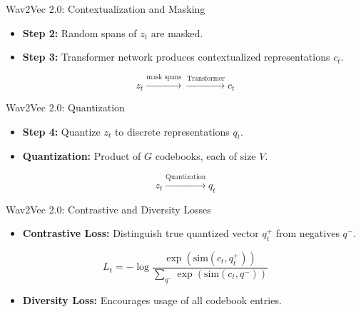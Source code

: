 \begin{frame}{Wav2Vec 2.0: Contextualization and Masking}
    \begin{itemize}
        \item \textbf{Step 2:} Random spans of $z_t$ are masked.
        \item \textbf{Step 3:} Transformer network produces contextualized representations $c_t$.
    \end{itemize}
    \[
        z_t \xrightarrow{\text{mask spans}} \xrightarrow{\text{Transformer}} c_t
    \]
\end{frame}

\begin{frame}{Wav2Vec 2.0: Quantization}
    \begin{itemize}
        \item \textbf{Step 4:} Quantize $z_t$ to discrete representations $q_t$.
        \item \textbf{Quantization:} Product of $G$ codebooks, each of size $V$.
    \end{itemize}
    \[
        z_t \xrightarrow{\text{Quantization}} q_t
    \]
\end{frame}

\begin{frame}{Wav2Vec 2.0: Contrastive and Diversity Losses}
    \begin{itemize}
        \item \textbf{Contrastive Loss:} Distinguish true quantized vector $q_t^+$ from negatives $q^-$.
    \end{itemize}
    \[
        L_t = -\log \frac{\exp(\mathrm{sim}(c_t, q_t^+))}{\sum_{q^-} \exp(\mathrm{sim}(c_t, q^-))}
    \]
    \begin{itemize}
        \item \textbf{Diversity Loss:} Encourages usage of all codebook entries.
    \end{itemize}
\end{frame}

